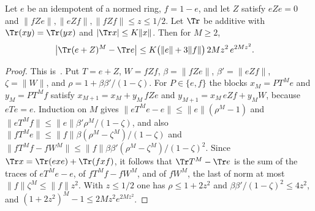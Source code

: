 \begin{lemma}
    \label{thm:ldp_idempotent_second_order}
    \leanok
    Let $e$ be an idempotent of a normed ring, $f=1-e$, and let $Z$ satisfy
    $eZe=0$ and $\lVert fZe\rVert,\lVert eZf\rVert,\lVert fZf\rVert\le z\le1/2$.
    Let $\Tr$ be additive with $\Tr(xy)=\Tr(yx)$ and
    $\lvert\Tr x\rvert\le K\lVert x\rVert$. Then for $M\ge2$,
    \begin{align}
        \bigl\lvert\Tr(e+Z)^M-\Tr e\bigr\rvert
         & \le K\bigl(\lVert e\rVert+3\lVert f\rVert\bigr)\,2Mz^2\,e^{2Mz^2}.
        \notag
    \end{align}
\end{lemma}
\begin{proof}
    \leanok
    This is~\cite[``Powers of a perturbed idempotent without first-order
        term'']{QICLean2026Blueprint}.
    Put $T=e+Z$, $W=fZf$, $\beta=\lVert fZe\rVert$, $\beta'=\lVert eZf\rVert$,
    $\zeta=\lVert W\rVert$, and $\rho=1+\beta\beta'/(1-\zeta)$. For $P\in\{e,f\}$
    the blocks $x_M=PT^Me$ and $y_M=PT^Mf$ satisfy
    $x_{M+1}=x_M+y_M\,fZe$ and $y_{M+1}=x_M\,eZf+y_MW$, because $eTe=e$.
    Induction on $M$ gives $\lVert eT^Me-e\rVert\le\lVert e\rVert(\rho^M-1)$ and
    $\lVert eT^Mf\rVert\le\lVert e\rVert\beta'\rho^M/(1-\zeta)$, and also
    $\lVert fT^Me\rVert\le\lVert f\rVert\beta(\rho^M-\zeta^M)/(1-\zeta)$ and
    $\lVert fT^Mf-fW^M\rVert\le\lVert f\rVert\beta\beta'(\rho^M-\zeta^M)/(1-\zeta)^2$.
    Since $\Tr x=\Tr(exe)+\Tr(fxf)$, it follows that $\Tr T^M-\Tr e$ is the sum of
    the traces of $eT^Me-e$, of $fT^Mf-fW^M$, and of $fW^M$, the last of norm at
    most $\lVert f\rVert\zeta^M\le\lVert f\rVert z^2$. With $z\le1/2$ one has
    $\rho\le1+2z^2$ and $\beta\beta'/(1-\zeta)^2\le4z^2$, and
    $(1+2z^2)^M-1\le2Mz^2e^{2Mz^2}$.
\end{proof}

